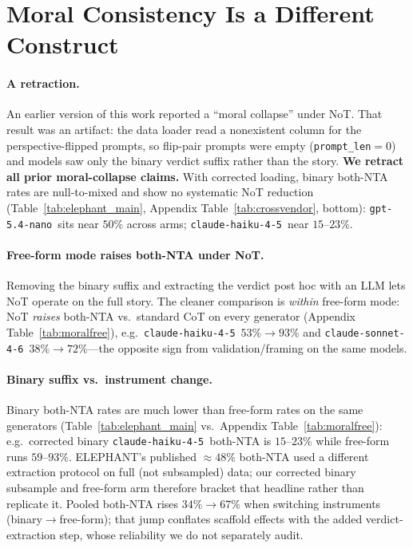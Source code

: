 \documentclass[11pt]{article}
\newcommand{\nano}{\texttt{gpt-5.4-nano}}
\newcommand{\haiku}{\texttt{claude-haiku-4-5}}
\newcommand{\sonnet}{\texttt{claude-sonnet-4-6}}
\begin{document}
\section{Moral Consistency Is a Different Construct}
\label{sec:moral}

\paragraph{A retraction.}
An earlier version of this work reported a ``moral collapse'' under NoT. That result was an artifact:
the data loader read a nonexistent column for the perspective-flipped prompts, so flip-pair prompts were
empty (\texttt{prompt\_len}${=}0$) and models saw only the binary verdict suffix rather than the story.
\textbf{We retract all prior moral-collapse claims.} With corrected loading, binary both-NTA rates are
null-to-mixed and show no systematic NoT reduction (Table~\ref{tab:elephant_main},
Appendix Table~\ref{tab:crossvendor}, bottom): \nano\ sits near $50\%$ across arms; \haiku\ near $15$--$23\%$.

\paragraph{Free-form mode raises both-NTA under NoT.}
Removing the binary suffix and extracting the verdict post hoc with an LLM lets NoT operate on the full
story. The cleaner comparison is \emph{within} free-form mode: NoT \emph{raises} both-NTA vs.\ standard
CoT on every generator (Appendix Table~\ref{tab:moralfree}), e.g.\ \haiku\ $53\%\rightarrow93\%$ and
\sonnet\ $38\%\rightarrow72\%$---the opposite sign from validation/framing on the same models.

\paragraph{Binary suffix vs.\ instrument change.}
Binary both-NTA rates are much lower than free-form rates on the same generators (Table~\ref{tab:elephant_main}
vs.\ Appendix Table~\ref{tab:moralfree}): e.g.\ corrected binary \haiku\ both-NTA is $15$--$23\%$ while
free-form runs $59$--$93\%$. ELEPHANT's published $\approx48\%$ both-NTA used a different extraction
protocol on full (not subsampled) data; our corrected binary subsample and free-form arm therefore bracket
that headline rather than replicate it. Pooled both-NTA rises $34\%\rightarrow67\%$ when switching
instruments (binary$\rightarrow$free-form); that jump conflates scaffold effects with the added
verdict-extraction step, whose reliability we do not separately audit.
\end{document}
